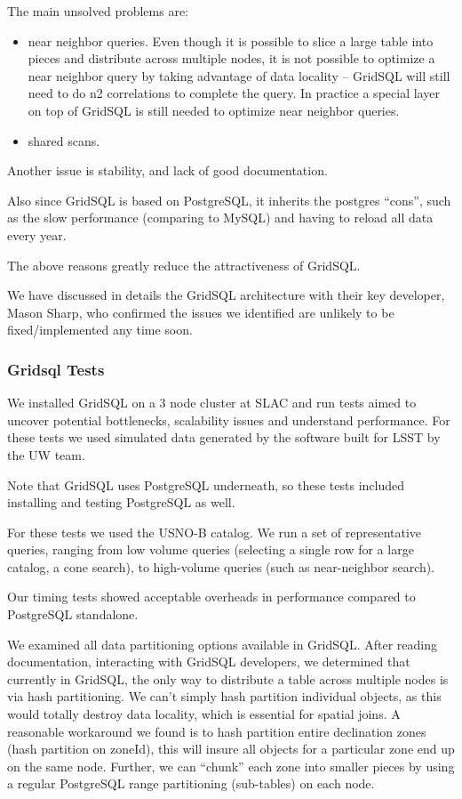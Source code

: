 \documentclass[DM,lsstdraft,toc]{lsstdoc}
\begin{document}
The main unsolved problems are:

\begin{itemize}
\item
  near neighbor queries. Even though it is possible to slice a large
  table into pieces and distribute across multiple nodes, it is not
  possible to optimize a near neighbor query by taking advantage of data
  locality -- GridSQL will still need to do n2 correlations to complete
  the query. In practice a special layer on top of GridSQL is still
  needed to optimize near neighbor queries.
\item
  shared scans.
\end{itemize}

Another issue is stability, and lack of good documentation.

Also since GridSQL is based on PostgreSQL, it inherits the postgres
``cons'', such as the slow performance (comparing to MySQL) and having
to reload all data every year.

The above reasons greatly reduce the attractiveness of GridSQL.

We have discussed in details the GridSQL architecture with their key
developer, Mason Sharp, who confirmed the issues we identified are
unlikely to be fixed/implemented any time soon.

\subsubsection{Gridsql Tests}\label{gridsql-tests}

We installed GridSQL on a 3 node cluster at SLAC and run tests aimed to
uncover potential bottlenecks, scalability issues and understand
performance. For these tests we used simulated data generated by the
software built for LSST by the UW team.

Note that GridSQL uses PostgreSQL underneath, so these tests included
installing and testing PostgreSQL as well.

For these tests we used the USNO-B catalog. We run a set of
representative queries, ranging from low volume queries (selecting a
single row for a large catalog, a cone search), to high-volume queries
(such as near-neighbor search).

Our timing tests showed acceptable overheads in performance compared to
PostgreSQL standalone.

We examined all data partitioning options available in GridSQL. After
reading documentation, interacting with GridSQL developers, we
determined that currently in GridSQL, the only way to distribute a table
across multiple nodes is via hash partitioning. We can't simply hash
partition individual objects, as this would totally destroy data
locality, which is essential for spatial joins. A reasonable workaround
we found is to hash partition entire declination zones (hash partition
on zoneId), this will insure all objects for a particular zone end up on
the same node. Further, we can ``chunk'' each zone into smaller pieces
by using a regular PostgreSQL range partitioning (sub-tables) on each
node.
\end{document}
